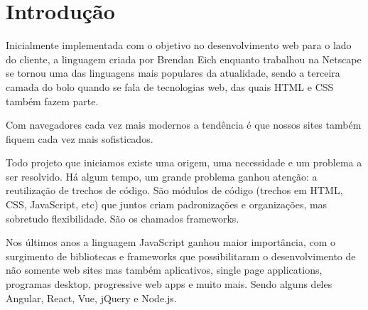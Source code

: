 \documentclass[
	12pt,				%
	openright,			%
	twoside,			%
	a4paper,			%
	english,			%
	brazil				%
	]{abntex2}
\begin{document}

\tableofcontents*
\cleardoublepage


\textual


\chapter{Introdução}

Inicialmente implementada com o objetivo no desenvolvimento web para o lado do
cliente, a linguagem criada por Brendan Eich enquanto trabalhou na Netscape se tornou
uma das linguagens mais populares da atualidade, sendo a terceira camada do bolo quando
se fala de tecnologias web, das quais HTML e CSS também fazem parte. 

Com navegadores cada vez mais modernos a tendência é que nossos sites também fiquem cada vez mais sofisticados.

Todo projeto que iniciamos existe uma origem, uma necessidade e um 
problema a ser resolvido. Há algum tempo, um grande problema ganhou 
atenção: a reutilização de trechos de código. São módulos de código 
(trechos em HTML, CSS, JavaScript, etc) que juntos criam padronizações 
e organizações, mas sobretudo flexibilidade. São os chamados frameworks.

Nos últimos anos a linguagem JavaScript ganhou maior importância, com o
surgimento de bibliotecas e frameworks que possibilitaram o desenvolvimento de não
somente web sites mas também aplicativos, single page applications, programas desktop,
progressive web apps e muito mais. Sendo alguns deles Angular, React, Vue, jQuery e
Node.js.
\end{document}
